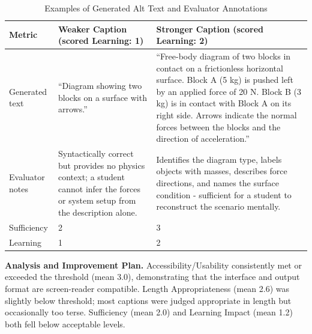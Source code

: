 \documentclass[12pt, titlepage]{article}
\begin{document}
\begin{table}[H]
\centering
\caption{Examples of Generated Alt Text and Evaluator Annotations}
\label{tab:caption-examples}
\small
\begin{tabularx}{\textwidth}{|p{}|p{}|p{}|}
\hline
\textbf{Metric} & \textbf{Weaker Caption (scored Learning: 1)} & \textbf{Stronger Caption (scored Learning: 2)} \\
\hline
Generated text &
``Diagram showing two blocks on a surface with arrows.'' &
``Free-body diagram of two blocks in contact on a frictionless horizontal surface. Block A (5 kg) is pushed left by an applied force of 20 N. Block B (3 kg) is in contact with Block A on its right side. Arrows indicate the normal forces between the blocks and the direction of acceleration.'' \\
\hline
Evaluator notes &
Syntactically correct but provides no physics context; a student cannot infer the forces or system setup from the description alone. &
Identifies the diagram type, labels objects with masses, describes force directions, and names the surface condition - sufficient for a student to reconstruct the scenario mentally. \\
\hline
Sufficiency & 2 & 3 \\
\hline
Learning & 1 & 2 \\
\hline
\end{tabularx}
\end{table}

\noindent\textbf{Analysis and Improvement Plan.}
Accessibility/Usability consistently met or exceeded the threshold (mean 3.0), demonstrating that the interface and output format are screen-reader compatible. Length Appropriateness (mean 2.6) was slightly below threshold; most captions were judged appropriate in length but occasionally too terse. Sufficiency (mean 2.0) and Learning Impact (mean 1.2) both fell below acceptable levels.
\end{document}

